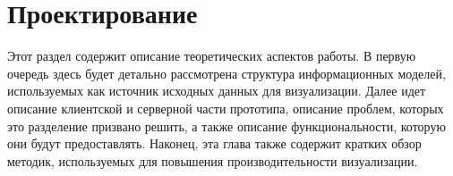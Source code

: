 ﻿\section{Проектирование}
\label{sections:Design}

Этот раздел содержит описание теоретических аспектов работы.
В первую очередь здесь будет детально рассмотрена
структура информационных моделей,
используемых как источник исходных данных для визуализации.
Далее идет описание клиентской и серверной части прототипа,
описание проблем, которых это разделение призвано решить,
а также описание функциональности, которую они будут предоставлять.
Наконец, эта глава также содержит кратких обзор методик,
используемых для повышения производительности визуализации.





